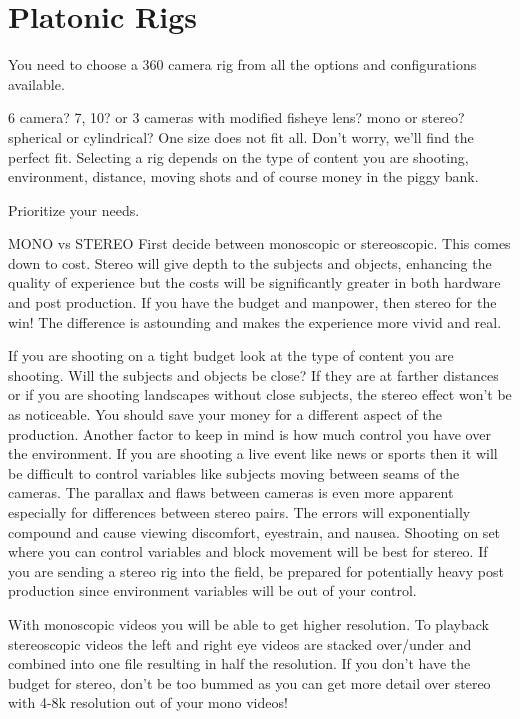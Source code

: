 \chapter{ Platonic Rigs}
\pagecolor{white}
\label{chap:1}
\begin{fullwidth}

\problem

{\large You need to choose a 360 camera rig from all the options and configurations available.
 \par}

6 camera? 7, 10? or 3 cameras with modified fisheye lens? mono or stereo? spherical or cylindrical? One size does not fit all. Don’t worry, we’ll find the perfect fit. Selecting a rig depends on the type of content you are shooting, environment, distance, moving shots and of course money in the piggy bank.

\solution

{\large Prioritize your needs.
 \par}

MONO vs STEREO
First decide between monoscopic or stereoscopic. This comes down to cost. Stereo will give depth to the subjects and objects, enhancing the quality of experience but the costs will be significantly greater in both hardware and post production. If you have the budget and manpower, then stereo for the win! The difference is astounding and makes the experience more vivid and real. 

If you are shooting on a tight budget look at the type of content you are shooting. Will the subjects and objects be close? If they are at farther distances or if you are shooting landscapes without close subjects, the stereo effect won’t be as noticeable. You should save your money for a different aspect of the production. Another factor to keep in mind is how much control you have over the environment. If you are shooting a live event like news or sports then it will be difficult to control variables like subjects moving between seams of the cameras. The parallax and flaws between cameras is even more apparent especially for differences between stereo pairs. The errors will exponentially compound and cause viewing discomfort, eyestrain, and nausea. Shooting on set where you can control variables and block movement will be best for stereo. If you are sending a stereo rig into the field, be prepared for potentially heavy post production since environment variables will be out of your control. 

With monoscopic videos you will be able to get higher resolution. To playback stereoscopic videos the left and right eye videos are stacked over/under and combined into one file resulting in half the resolution. If you don’t have the budget for stereo, don’t be too bummed as you can get more detail over stereo with 4-8k resolution out of your mono videos!


\end{fullwidth}

